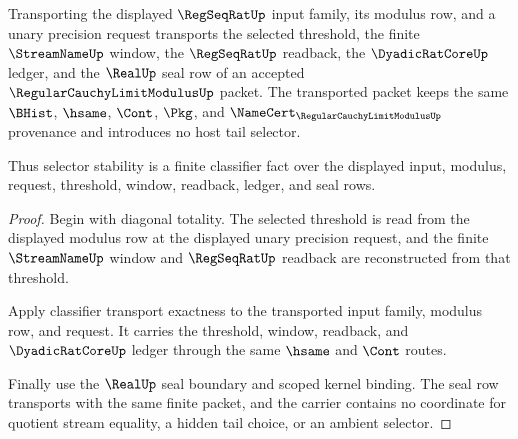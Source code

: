 \begin{theorem}
\label{thm:regular-cauchy-limit-modulus-tail-selector-stability}
Transporting the displayed $\RegSeqRatUp$ input family, its modulus row, and a unary precision request transports the selected threshold, the finite $\StreamNameUp$ window, the $\RegSeqRatUp$ readback, the $\DyadicRatCoreUp$ ledger, and the $\RealUp$ seal row of an accepted $\RegularCauchyLimitModulusUp$ packet. The transported packet keeps the same $\BHist$, $\hsame$, $\Cont$, $\Pkg$, and $\NameCert_{\RegularCauchyLimitModulusUp}$ provenance and introduces no host tail selector.

Thus selector stability is a finite classifier fact over the displayed input, modulus, request, threshold, window, readback, ledger, and seal rows.
\end{theorem}
\begin{proof}
Begin with diagonal totality. The selected threshold is read from the displayed modulus row at the displayed unary precision request, and the finite $\StreamNameUp$ window and $\RegSeqRatUp$ readback are reconstructed from that threshold.

Apply classifier transport exactness to the transported input family, modulus row, and request. It carries the threshold, window, readback, and $\DyadicRatCoreUp$ ledger through the same $\hsame$ and $\Cont$ routes.

Finally use the $\RealUp$ seal boundary and scoped kernel binding. The seal row transports with the same finite packet, and the carrier contains no coordinate for quotient stream equality, a hidden tail choice, or an ambient selector.
\end{proof}

